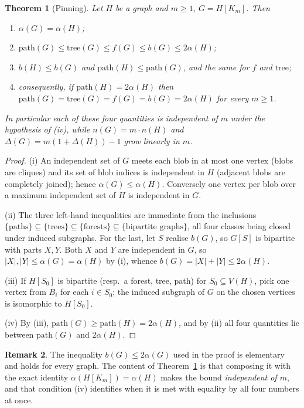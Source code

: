 \documentclass[10pt,a4paper]{article}
\theoremstyle{plain}
\newtheorem{theorem}{Theorem}[section]
\theoremstyle{definition}
\newtheorem{remark}[theorem]{Remark}
\newcommand{\ind}{\alpha}
\newcommand{\forestnum}{f}
\newcommand{\bipnum}{b}
\newcommand{\treenum}{\mathrm{tree}}
\newcommand{\pathnum}{\mathrm{path}}
\begin{document}
\begin{theorem}[Pinning]\label{thm:pinning}
Let $H$ be a graph and $m \ge 1$, $G = H[K_m]$. Then
\begin{enumerate}
\item[(i)] $\ind(G) = \ind(H)$;
\item[(ii)] $\pathnum(G) \le \treenum(G) \le \forestnum(G) \le \bipnum(G) \le 2\ind(H)$;
\item[(iii)] $\bipnum(H) \le \bipnum(G)$ and $\pathnum(H) \le \pathnum(G)$, and the same for
$\forestnum$ and $\treenum$;
\item[(iv)] consequently, if $\pathnum(H) = 2\ind(H)$ then
$\pathnum(G) = \treenum(G) = \forestnum(G) = \bipnum(G) = 2\ind(H)$ for every $m \ge 1$.
\end{enumerate}
In particular each of these four quantities is independent of $m$ under the hypothesis of (iv),
while $n(G) = m \cdot n(H)$ and $\Delta(G) = m(1 + \Delta(H)) - 1$ grow linearly in $m$.
\end{theorem}

\begin{proof}
(i) An independent set of $G$ meets each blob in at most one vertex (blobs are cliques) and its
set of blob indices is independent in $H$ (adjacent blobs are completely joined); hence
$\ind(G) \le \ind(H)$. Conversely one vertex per blob over a maximum independent set of $H$ is
independent in $G$.

(ii) The three left-hand inequalities are immediate from the inclusions
$\{\text{paths}\} \subseteq \{\text{trees}\} \subseteq \{\text{forests}\} \subseteq
\{\text{bipartite graphs}\}$, all four classes being closed under induced subgraphs. For the
last, let $S$ realise $\bipnum(G)$, so $G[S]$ is bipartite with parts $X, Y$. Both $X$ and $Y$
are independent in $G$, so $|X|,|Y| \le \ind(G) = \ind(H)$ by (i), whence
$\bipnum(G) = |X| + |Y| \le 2\ind(H)$.

(iii) If $H[S_0]$ is bipartite (resp.\ a forest, tree, path) for $S_0 \subseteq V(H)$, pick one
vertex from $B_i$ for each $i \in S_0$; the induced subgraph of $G$ on the chosen vertices is
isomorphic to $H[S_0]$.

(iv) By (iii), $\pathnum(G) \ge \pathnum(H) = 2\ind(H)$, and by (ii) all four quantities lie
between $\pathnum(G)$ and $2\ind(H)$.
\end{proof}

\begin{remark}
The inequality $\bipnum(G) \le 2\ind(G)$ used in the proof is elementary and holds for every
graph. The content of Theorem~\ref{thm:pinning} is that composing it with the exact identity
$\ind(H[K_m]) = \ind(H)$ makes the bound \emph{independent of $m$}, and that condition (iv)
identifies when it is met with equality by all four numbers at once.
\end{remark}
\end{document}
